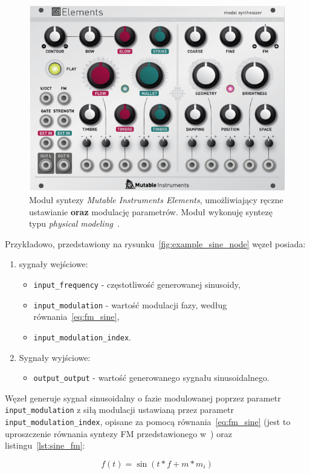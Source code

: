 \begin{figure}[H]\label{fig:example_eurorack_module}
    \centering
    \includegraphics[width=0.45\linewidth]{rys02/mutable_instruments_elements.png}
    \caption{
      Moduł syntezy \textit{Mutable Instruments Elements}, umożliwiający ręczne ustawianie \textbf{oraz} modulację
      parametrów. Moduł wykonuję syntezę typu \textit{physical modeling}~\cite{lisp_synthesis}.
    }
\end{figure}

\noindent
Przykładowo, przedstawiony na rysunku~\ref{fig:example_sine_node} węzeł posiada:
\begin{enumerate}
  \item sygnały wejściowe:
  \begin{itemize}
    \item \texttt{input\_frequency} - częstotliwość generowanej sinusoidy,
    \item \texttt{input\_modulation} - wartość modulacji fazy, według równania~\ref{eq:fm_sine},
    \item \texttt{input\_modulation\_index}.
  \end{itemize}
  \item Sygnały wyjściowe:
  \begin{itemize}
    \item \texttt{output\_output} - wartość generowanego sygnału sinusoidalnego.
  \end{itemize}
\end{enumerate}

\noindent
Węzeł generuje sygnał sinusoidalny o fazie modulowanej poprzez parametr \texttt{input\_modulation} z siłą modulacji ustawianą przez
parametr \texttt{input\_modulation\_index}, opisane za pomocą równania~\ref{eq:fm_sine}
(jest to uproszczenie równania syntezy FM przedstawionego w~\cite{spectral_audio_processing}) oraz listingu~\ref{lst:sine_fm}:

\begin{equation} \label{eq:fm_sine}
  f(t) = \sin(t * f + m * m_i)
\end{equation}

